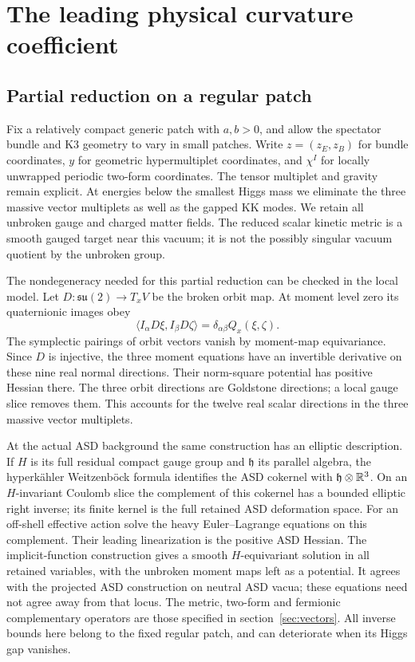\section{The leading physical curvature coefficient}\label{sec:scalar}

\subsection{Partial reduction on a regular patch}
Fix a relatively compact generic patch with $a,b>0$, and allow
the spectator bundle and K3 geometry to vary in small patches.
Write $z=(z_E,z_B)$ for bundle coordinates, $y$ for geometric
hypermultiplet coordinates, and $\chi^I$ for locally unwrapped
periodic two-form coordinates. The tensor multiplet and gravity
remain explicit. At energies below the smallest Higgs mass we
eliminate the three massive vector multiplets as well as the
gapped KK modes. We retain all unbroken gauge and charged matter
fields. The reduced scalar kinetic metric is a smooth gauged
target near this vacuum; it is not the possibly singular vacuum
quotient by the unbroken group.

The nondegeneracy needed for this partial reduction can be checked
in the local model. Let $D:\mathfrak{su}(2)\to T_xV$ be the
broken orbit map. At moment level zero its quaternionic images
obey
\begin{equation}\label{eq:normals}
 \langle I_\alpha D\xi,I_\beta D\zeta\rangle
                 =\delta_{\alpha\beta}Q_x(\xi,\zeta).
\end{equation}
The symplectic pairings of orbit vectors vanish by moment-map
equivariance. Since $D$ is injective, the three moment equations
have an invertible derivative on these nine real normal directions.
Their norm-square potential has positive Hessian there. The three
orbit directions are Goldstone directions; a local gauge slice
removes them. This accounts for the twelve real scalar directions
in the three massive vector multiplets.

At the actual ASD background the same construction has an elliptic
description. If $H$ is its full residual compact gauge group and
$\mathfrak h$ its parallel algebra, the hyperk\"ahler Weitzenb\"ock
formula identifies the ASD cokernel with
$\mathfrak h\otimes\mathbb R^3$. On an $H$-invariant Coulomb slice the
complement of this cokernel has a bounded elliptic right inverse;
its finite kernel is the full retained ASD deformation space.
For an off-shell effective action solve the heavy
Euler--Lagrange equations on this complement. Their leading
linearization is the positive ASD Hessian. The implicit-function
construction gives a smooth $H$-equivariant solution in all retained
variables, with the unbroken moment maps left as a potential.
It agrees with the projected ASD construction on neutral ASD vacua;
these equations need not agree away from that locus. The metric,
two-form and fermionic complementary operators are those specified
in section~\ref{sec:vectors}. All inverse bounds here belong to
the fixed regular patch, and can deteriorate when its Higgs gap
vanishes.

